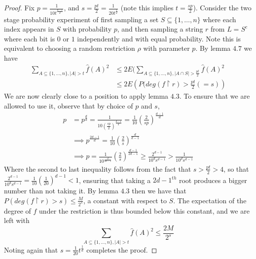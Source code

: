 \documentclass{article}
\theoremstyle{definition}
\theoremstyle{plain}
\theoremstyle{theorem}
\begin{document}
\begin{proof}
	Fix $p = \frac{1}{10t^{\frac{d-1}{d}}}$, and $s = \frac{pt}{2} = \frac{1}{20t^{\frac{1}{d}}}$ (note this implies $t = \frac{sp}{2}$). Consider the two stage probability experiment of first sampling a set $S \subseteq \{1,\ldots,n\}$ where each index appears in $S$ with probability $p$, and then sampling a string $r$ from $L = S^c$ where each bit is $0$ or $1$ independently and with equal probability. Note this is equivalent to choosing a random restriction $\rho$ with parameter $p$. By lemma $4.7$ we have
	\begin{align*} \sum_{A \subseteq \{1,\ldots,n\}, |A| > t} \hat{f}(A)^2 &\leq 2E(\sum_{A \subseteq \{1,\ldots,n\},|A \cap S| > \frac{pt}{2}} \hat{f}(A)^2 \\
	&\leq 2E\left(P(deg(f\restriction r) > \frac{pt}{2} (= s)\right)
	\end{align*}
We are now clearly close to a position to apply lemma $4.3$. To ensure that we are allowed to use it, observe that by choice of $p$ and $s$,
\begin{align*} 
	p &= p^{\frac{d}{d}} = \frac{1}{10(\frac{sp}{2})^{\frac{d-1}{d}}} = \frac{1}{10}\left( \frac{2}{sp} \right)^{\frac{d-1}{d}}  \\
	&\implies p^{\frac{2d-1}{d}} = \frac{1}{10}\left( \frac{2}{s} \right)^{\frac{d}{d-1}} \\
	&\implies p = \frac{1}{10^{\frac{d}{2d-1}}} \left( \frac{2}{s} \right)^{\frac{d-1}{2d-1}} \geq \frac{2^{d-1}}{10^ds^{d-1}} > \frac{1}{10^ds^{d-1}} 
\end{align*}
Where the second to last inequality follows from the fact that $s > \frac{pt}{2} > 4$, so that $\frac{2^{d-1}}{10^ds^{d-1}} = \frac{1}{10}\left(\frac{1}{20} \right)^{d-1} < 1$, ensuring that taking a $2d-1^{th}$ root produces a bigger number than not taking it. By lemma $4.3$ then we have that $P(deg(f\restriction r) > s) \leq \frac{M}{2^s}$, a constant with respect to $S$. The expectation of the degree of $f$ under the restriction is thus bounded below this constant, and we are left with
\[ \sum_{A \subseteq \{1,\ldots,n\}, |A| > t} \hat{f}(A)^2 \leq \frac{2M}{2^s} \]
Noting again that $s = \frac{1}{20}t^{\frac{1}{d}}$ completes the proof. 
\end{proof}
\end{document}
